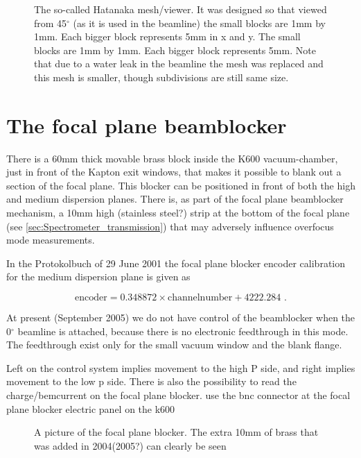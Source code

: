 \documentclass[11pt]{report}
\begin{document}
\begin{figure}[!ht]
\centerline{\vspace{0cm}\hspace{0cm}
}
\centering
\caption{The so-called Hatanaka mesh/viewer. It was designed so that viewed from 45$^{\circ}$
(as it is used in the beamline) the small blocks are 1mm by 1mm. 
Each bigger block represents 5mm in x and y.
The small blocks are 1mm by 1mm. Each bigger block represents 5mm.
Note that due to a water leak in the beamline the mesh was replaced and this mesh is smaller, though subdivisions are still same size.}
\label{fig:hatanaka-2}
\end{figure} 


\section{The focal plane beamblocker}\label{sec:fpbs}

There is a 60mm thick movable brass block inside the K600 vacuum-chamber, just
in front of the Kapton exit windows, that makes it possible to blank out a section 
of the focal plane. This blocker can be positioned in front of 
both the high and medium dispersion planes.
There is, as part of the focal plane beamblocker mechanism, a 10mm high (stainless steel?) 
strip at the bottom of the focal plane (see \ref{sec:Spectrometer_transmission}) that may adversely influence
overfocus mode measurements.

In the Protokolbuch of 29 June 2001 the focal plane blocker encoder 
calibration for the medium dispersion plane is given as

\begin{equation} 
\textrm{encoder}=0.348872 \times \textrm{channelnumber} + 4222.284
\textrm{     .}
\end{equation} 

At present (September 2005) we do not have control of the beamblocker when the
0$^{\circ}$ beamline is attached, because there is no electronic feedthrough 
in this mode. The feedthrough exist only for the small vacuum window and the blank flange.

Left on the control system implies movement to the high P side, and right implies movement 
to the low p side.
There is also the possibility to read the charge/bemcurrent on the focal plane blocker.
use the bnc connector at the focal plane blocker electric panel on the k600

\begin{figure}[!ht]
\centerline{\vspace{0cm}\hspace{0cm}
}
\centering
\caption{A picture of the focal plane blocker. The extra 10mm of brass that was added in
2004(2005?)  can clearly be seen}
\label{fig:fpbs-pic}
\end{figure} 
\end{document}
